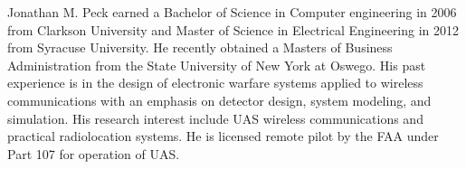 \documentclass[journal,transmag]{IEEEtran}
\begin{document}


%
%
%

% 

\begin{IEEEbiography}{Jonathan M. Peck}
earned a Bachelor of Science in Computer engineering in 2006 from Clarkson University and Master of Science in Electrical Engineering in 2012 from Syracuse University. He recently obtained a Masters of Business Administration from the State University of New York at Oswego. His past experience is in the design of electronic warfare systems applied to wireless communications with an emphasis on detector design, system modeling, and simulation. His research interest include UAS wireless communications and practical radiolocation systems. He is licensed remote pilot by the FAA under Part 107 for operation of UAS.
\end{IEEEbiography}
\end{document}
